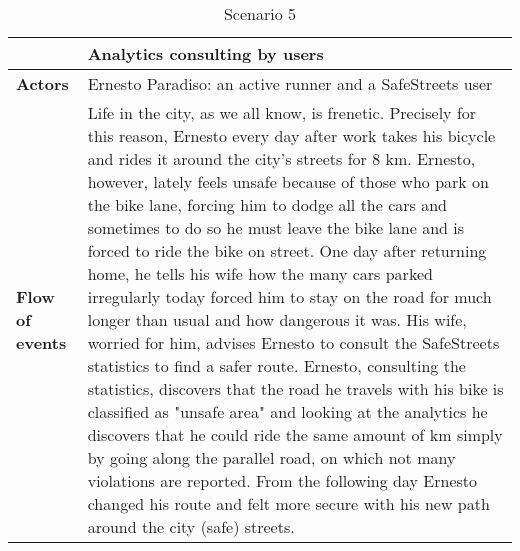 \begin{table}[!htbp]
	\centering
\begin{tabular}{lp{9cm}}
\hline
\bf\large  &\bf\large Analytics consulting by users\\
\hline
\hline

\bf Actors&Ernesto Paradiso: an active runner and a SafeStreets user\\
\hline
\bf Flow of events&
Life in the city, as we all know, is frenetic. Precisely for this reason, Ernesto every day after work takes his bicycle and rides it around the city's streets for 8 km.
Ernesto, however, lately feels unsafe because of those who park on the bike lane, forcing him to dodge all the cars and sometimes to do so he must leave the bike lane and is forced to ride the bike on street.
One day after returning home, he tells his wife how the many cars parked irregularly today forced him to stay on the road for much longer than usual and how dangerous it was.
His wife, worried for him, advises Ernesto to consult the SafeStreets statistics to find a safer route.
Ernesto, consulting the statistics, discovers that the road he travels with his bike is classified as "unsafe area" and looking at the analytics he discovers that he could ride the same amount of km simply by going along the parallel road, on which not many violations are reported.
From the following day Ernesto changed his route and felt more secure with his new path around the city (safe) streets.
\end{tabular}
\caption{Scenario 5} 
\label{tab:scenariofive}
\end{table}